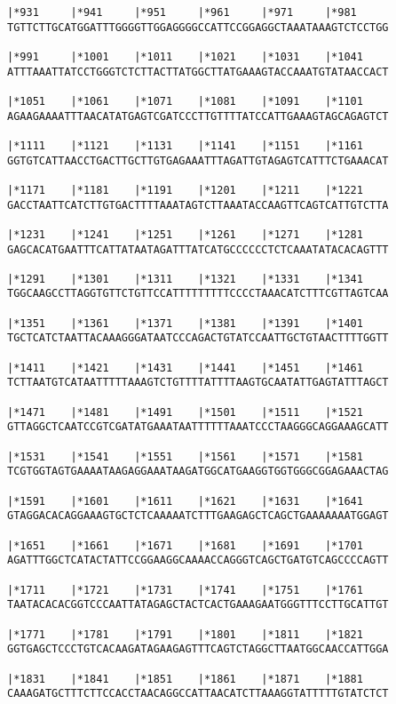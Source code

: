 \documentclass{article}
\begin{document}
\begin{Verbatim}
|*931     |*941     |*951     |*961     |*971     |*981     
TGTTCTTGCATGGATTTGGGGTTGGAGGGGCCATTCCGGAGGCTAAATAAAGTCTCCTGG
  
|*991     |*1001    |*1011    |*1021    |*1031    |*1041    
ATTTAAATTATCCTGGGTCTCTTACTTATGGCTTATGAAAGTACCAAATGTATAACCACT
  
|*1051    |*1061    |*1071    |*1081    |*1091    |*1101    
AGAAGAAAATTTAACATATGAGTCGATCCCTTGTTTTATCCATTGAAAGTAGCAGAGTCT
  
|*1111    |*1121    |*1131    |*1141    |*1151    |*1161    
GGTGTCATTAACCTGACTTGCTTGTGAGAAATTTAGATTGTAGAGTCATTTCTGAAACAT
  
|*1171    |*1181    |*1191    |*1201    |*1211    |*1221    
GACCTAATTCATCTTGTGACTTTTAAATAGTCTTAAATACCAAGTTCAGTCATTGTCTTA
  
|*1231    |*1241    |*1251    |*1261    |*1271    |*1281    
GAGCACATGAATTTCATTATAATAGATTTATCATGCCCCCCTCTCAAATATACACAGTTT
  
|*1291    |*1301    |*1311    |*1321    |*1331    |*1341    
TGGCAAGCCTTAGGTGTTCTGTTCCATTTTTTTTTCCCCTAAACATCTTTCGTTAGTCAA
  
|*1351    |*1361    |*1371    |*1381    |*1391    |*1401    
TGCTCATCTAATTACAAAGGGATAATCCCAGACTGTATCCAATTGCTGTAACTTTTGGTT
  
|*1411    |*1421    |*1431    |*1441    |*1451    |*1461    
TCTTAATGTCATAATTTTTAAAGTCTGTTTTATTTTAAGTGCAATATTGAGTATTTAGCT
  
|*1471    |*1481    |*1491    |*1501    |*1511    |*1521    
GTTAGGCTCAATCCGTCGATATGAAATAATTTTTTAAATCCCTAAGGGCAGGAAAGCATT
  
|*1531    |*1541    |*1551    |*1561    |*1571    |*1581    
TCGTGGTAGTGAAAATAAGAGGAAATAAGATGGCATGAAGGTGGTGGGCGGAGAAACTAG
  
|*1591    |*1601    |*1611    |*1621    |*1631    |*1641    
GTAGGACACAGGAAAGTGCTCTCAAAAATCTTTGAAGAGCTCAGCTGAAAAAAATGGAGT
  
|*1651    |*1661    |*1671    |*1681    |*1691    |*1701    
AGATTTGGCTCATACTATTCCGGAAGGCAAAACCAGGGTCAGCTGATGTCAGCCCCAGTT
  
|*1711    |*1721    |*1731    |*1741    |*1751    |*1761    
TAATACACACGGTCCCAATTATAGAGCTACTCACTGAAAGAATGGGTTTCCTTGCATTGT
  
|*1771    |*1781    |*1791    |*1801    |*1811    |*1821    
GGTGAGCTCCCTGTCACAAGATAGAAGAGTTTCAGTCTAGGCTTAATGGCAACCATTGGA
  
|*1831    |*1841    |*1851    |*1861    |*1871    |*1881    
CAAAGATGCTTTCTTCCACCTAACAGGCCATTAACATCTTAAAGGTATTTTTGTATCTCT
  

\end{Verbatim}
\end{document}
